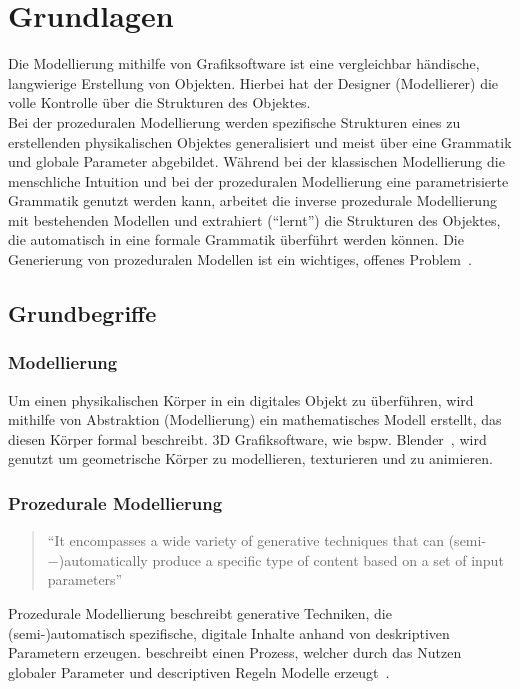 
\chapter{Grundlagen}

Die Modellierung mithilfe von Grafiksoftware ist eine vergleichbar händische, langwierige Erstellung von
Objekten.
Hierbei hat der Designer (Modellierer) die volle Kontrolle über die Strukturen des Objektes.\\
Bei der prozeduralen Modellierung werden spezifische Strukturen eines zu erstellenden physikalischen Objektes
generalisiert und meist über eine Grammatik und globale Parameter abgebildet.
Während bei der klassischen Modellierung die menschliche Intuition und bei der prozeduralen Modellierung eine
parametrisierte Grammatik genutzt werden kann, arbeitet die inverse prozedurale Modellierung mit bestehenden Modellen und
extrahiert ("`lernt"') die Strukturen des Objektes, die automatisch in eine formale Grammatik überführt werden können.
Die Generierung von prozeduralen Modellen ist ein wichtiges, offenes Problem~\cite{benes_2011}.

\section{Grundbegriffe}

\subsection*{Modellierung}
Um einen physikalischen Körper in ein digitales Objekt zu überführen, wird mithilfe von Abstraktion (Modellierung)
ein mathematisches Modell erstellt, das diesen Körper formal beschreibt.
3D Grafiksoftware, wie bspw. Blender~\cite{blender}, wird genutzt um geometrische Körper zu modellieren, texturieren
und zu animieren.

\newpage

\subsection*{Prozedurale Modellierung}
\begin{quote}
    "`It encompasses a wide variety of generative techniques that
    can (semi-−)automatically produce a specific type of content based on a set of input
    parameters"'~\cite{smelik_2014}
\end{quote}
Prozedurale Modellierung beschreibt generative Techniken, die \\(semi-)automatisch spezifische, digitale
Inhalte anhand von deskriptiven Parametern erzeugen.
\citeauthor{smelik_2014} beschreibt einen Prozess, welcher durch das Nutzen globaler Parameter und descriptiven Regeln
Modelle erzeugt~\cite{smelik_2014}.
